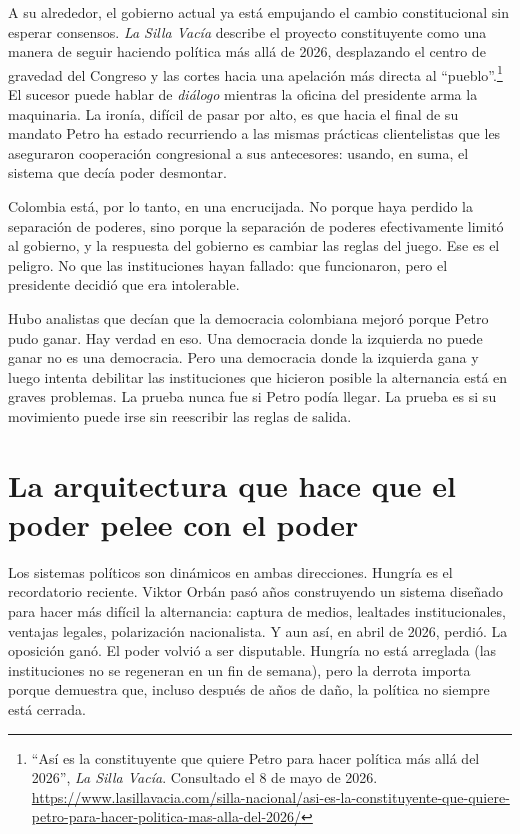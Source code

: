 \documentclass[11pt,letterpaper]{article}
\begin{document}
A su alrededor, el gobierno actual ya está empujando el cambio constitucional sin esperar consensos. \textit{La Silla Vacía} describe el proyecto constituyente como una manera de seguir haciendo política más allá de 2026, desplazando el centro de gravedad del Congreso y las cortes hacia una apelación más directa al ``pueblo''.\footnote{``Así es la constituyente que quiere Petro para hacer política más allá del 2026'', \textit{La Silla Vacía}. Consultado el 8 de mayo de 2026. \url{https://www.lasillavacia.com/silla-nacional/asi-es-la-constituyente-que-quiere-petro-para-hacer-politica-mas-alla-del-2026/}} El sucesor puede hablar de \textit{diálogo} mientras la oficina del presidente arma la maquinaria. La ironía, difícil de pasar por alto, es que hacia el final de su mandato Petro ha estado recurriendo a las mismas prácticas clientelistas que les aseguraron cooperación congresional a sus antecesores: usando, en suma, el sistema que decía poder desmontar.

Colombia está, por lo tanto, en una encrucijada. No porque haya perdido la separación de poderes, sino porque la separación de poderes efectivamente limitó al gobierno, y la respuesta del gobierno es cambiar las reglas del juego. Ese es el peligro. No que las instituciones hayan fallado: que funcionaron, pero el presidente decidió que era intolerable.

Hubo analistas que decían que la democracia colombiana mejoró porque Petro pudo ganar. Hay verdad en eso. Una democracia donde la izquierda no puede ganar no es una democracia. Pero una democracia donde la izquierda gana y luego intenta debilitar las instituciones que hicieron posible la alternancia está en graves problemas. La prueba nunca fue si Petro podía llegar. La prueba es si su movimiento puede irse sin reescribir las reglas de salida.

\section{La arquitectura que hace que el poder pelee con el poder}

Los sistemas políticos son dinámicos en ambas direcciones. Hungría es el recordatorio reciente. Viktor Orbán pasó años construyendo un sistema diseñado para hacer más difícil la alternancia: captura de medios, lealtades institucionales, ventajas legales, polarización nacionalista. Y aun así, en abril de 2026, perdió. La oposición ganó. El poder volvió a ser disputable. Hungría no está arreglada (las instituciones no se regeneran en un fin de semana), pero la derrota importa porque demuestra que, incluso después de años de daño, la política no siempre está cerrada.
\end{document}
